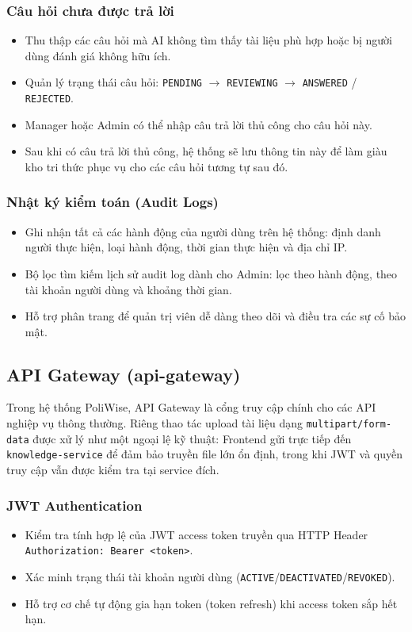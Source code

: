 \documentclass[12pt,a4paper]{report}
\begin{document}
\subsubsection{Câu hỏi chưa được trả lời}
\begin{itemize}
    \item Thu thập các câu hỏi mà AI không tìm thấy tài liệu phù hợp hoặc bị người dùng đánh giá không hữu ích.
    \item Quản lý trạng thái câu hỏi: \texttt{PENDING} $\rightarrow$ \texttt{REVIEWING} $\rightarrow$ \texttt{ANSWERED} / \texttt{REJECTED}.
    \item Manager hoặc Admin có thể nhập câu trả lời thủ công cho câu hỏi này.
    \item Sau khi có câu trả lời thủ công, hệ thống sẽ lưu thông tin này để làm giàu kho tri thức phục vụ cho các câu hỏi tương tự sau đó.
\end{itemize}

\subsubsection{Nhật ký kiểm toán (Audit Logs)}
\begin{itemize}
    \item Ghi nhận tất cả các hành động của người dùng trên hệ thống: định danh người thực hiện, loại hành động, thời gian thực hiện và địa chỉ IP.
    \item Bộ lọc tìm kiếm lịch sử audit log dành cho Admin: lọc theo hành động, theo tài khoản người dùng và khoảng thời gian.
    \item Hỗ trợ phân trang để quản trị viên dễ dàng theo dõi và điều tra các sự cố bảo mật.
\end{itemize}

\subsection{API Gateway (api-gateway)}

Trong hệ thống PoliWise, API Gateway là cổng truy cập chính cho các API nghiệp vụ thông thường. Riêng thao tác upload tài liệu dạng \texttt{multipart/form-data} được xử lý như một ngoại lệ kỹ thuật: Frontend gửi trực tiếp đến \texttt{knowledge-service} để đảm bảo truyền file lớn ổn định, trong khi JWT và quyền truy cập vẫn được kiểm tra tại service đích.

\subsubsection{JWT Authentication}
\begin{itemize}
    \item Kiểm tra tính hợp lệ của JWT access token truyền qua HTTP Header \texttt{Authorization: Bearer <token>}.
    \item Xác minh trạng thái tài khoản người dùng (\texttt{ACTIVE}/\texttt{DEACTIVATED}/\texttt{REVOKED}).
    \item Hỗ trợ cơ chế tự động gia hạn token (token refresh) khi access token sắp hết hạn.
\end{itemize}
\end{document}

